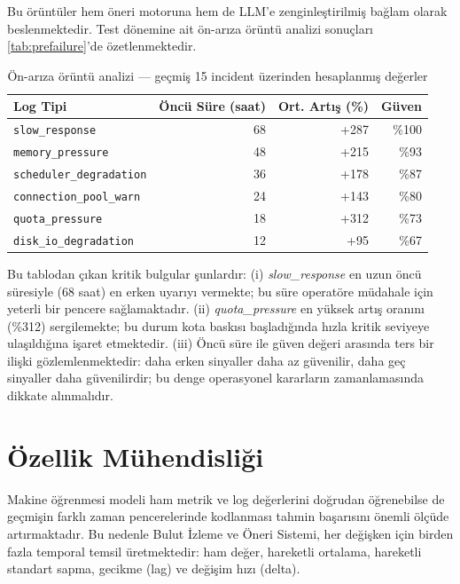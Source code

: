 Bu örüntüler hem öneri motoruna hem de LLM'e zenginleştirilmiş bağlam olarak beslenmektedir.
Test dönemine ait ön-arıza örüntü analizi sonuçları \autoref{tab:prefailure}'de özetlenmektedir.

\begin{table}[htbp]
    \centering
    \caption{Ön-arıza örüntü analizi — geçmiş 15 incident üzerinden hesaplanmış değerler}
    \label{tab:prefailure}
    \begin{tabular}{lrrr}
        \textbf{Log Tipi} & \textbf{Öncü Süre (saat)} & \textbf{Ort. Artış (\%)} & \textbf{Güven} \\
        \hline
        \texttt{slow\_response}          & 68 & +287 & \%100 \\
        \texttt{memory\_pressure}        & 48 & +215 & \%93  \\
        \texttt{scheduler\_degradation}  & 36 & +178 & \%87  \\
        \texttt{connection\_pool\_warn}  & 24 & +143 & \%80  \\
        \texttt{quota\_pressure}         & 18 & +312 & \%73  \\
        \texttt{disk\_io\_degradation}   & 12 & +95  & \%67  \\
    \end{tabular}
\end{table}

Bu tablodan çıkan kritik bulgular şunlardır: (i) \textit{slow\_response} en uzun öncü süresiyle (68 saat) en erken uyarıyı vermekte; bu süre operatöre müdahale için yeterli bir pencere sağlamaktadır.
(ii) \textit{quota\_pressure} en yüksek artış oranını (\%312) sergilemekte; bu durum kota baskısı başladığında hızla kritik seviyeye ulaşıldığına işaret etmektedir.
(iii) Öncü süre ile güven değeri arasında ters bir ilişki gözlemlenmektedir: daha erken sinyaller daha az güvenilir, daha geç sinyaller daha güvenilirdir; bu denge operasyonel kararların zamanlamasında dikkate alınmalıdır.


\section{Özellik Mühendisliği}
\label{sec:ozellik}

Makine öğrenmesi modeli ham metrik ve log değerlerini doğrudan öğrenebilse de geçmişin farklı zaman pencerelerinde kodlanması tahmin başarısını önemli ölçüde artırmaktadır.
Bu nedenle Bulut İzleme ve Öneri Sistemi, her değişken için birden fazla temporal temsil üretmektedir: ham değer, hareketli ortalama, hareketli standart sapma, gecikme (lag) ve değişim hızı (delta).


